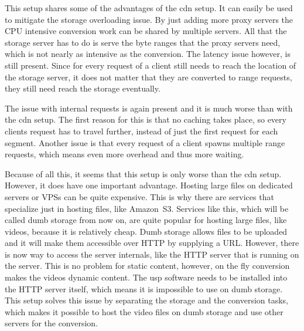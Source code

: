 \documentclass[twoside,openright]{uva-bachelor-thesis}
\begin{document}
This setup shares some of the advantages of the \gls{cdn} setup. It can easily
be used to mitigate the storage overloading issue. By just adding more proxy
servers the CPU intensive conversion work can be shared by multiple servers. All
that the storage server has to do is serve the byte ranges that the proxy
servers need, which is not nearly as intensive as the conversion. The latency
issue however, is still present. Since for every request of a client still needs
to reach the location of the storage server, it does not matter that they are
converted to range requests, they still need reach the storage eventually.

The issue with internal requests is again present and it is much worse than with
the \gls{cdn} setup. The first reason for this is that no caching takes place,
so every clients request has to travel further, instead of just the first
request for each segment. Another issue is that every request of a client spawns
multiple range requests, which means even more overhead and thus more waiting.

Because of all this, it seems that this setup is only worse than the \gls{cdn}
setup. However, it does have one important advantage. Hosting large files on
dedicated servers or VPSs can be quite expensive. This is why there are
services that specialize just in hosting files, like Amazon~S3. Services like
this, which will be called dumb storage from now on, are quite popular for
hosting large files, like videos, because it is relatively cheap. Dumb storage
allows files to be uploaded and it will make them accessible over HTTP by
supplying a URL\@.  However, there is now way to access the server internals,
like the HTTP server that is running on the server. This is no problem for
static content, however, on the fly conversion makes the videos dynamic content.
The \gls{usp} software needs to be installed into the HTTP server itself, which
means it is impossible to use on dumb storage. This setup solves this issue by
separating the storage and the conversion tasks, which makes it possible to host
the video files on dumb storage and use other servers for the conversion.
\end{document}
